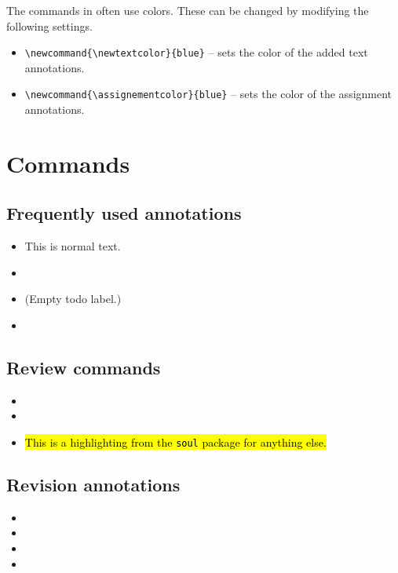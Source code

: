 \documentclass{article}
\begin{document}
The commands in  often use colors. These can be changed by modifying the following settings.
\begin{itemize}
    \item \verb|\newcommand{\newtextcolor}{blue}| -- sets the color of the added text annotations.
    \item \verb|\newcommand{\assignementcolor}{blue}| -- sets the color of the assignment annotations.
\end{itemize}





\section{Commands}\label{sec:commands}

\subsection{Frequently used annotations}

\begin{itemize}
    \item This is normal text.
    \item {}
    \item \todo{} (Empty todo label.)
    \item {}
\end{itemize}

\subsection{Review commands}

\begin{itemize}
    \item {}
    \item {}
    \item \hl{This is a highlighting from the \texttt{soul} package for anything else.}
\end{itemize}

\subsection{Revision annotations}

\begin{itemize}
    \item {}
    \item {}
    \item {}
    \item {}
    
\end{itemize}
\end{document}
